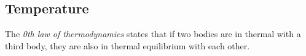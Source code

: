 \subsection{Temperature}\label{subsec:Temperature}
\begin{definition}\label{def:0_Law_Thermo}
  The \emph{0th law of thermodynamics} states that if two bodies are in thermal  with a third body, they are also in thermal equilibrium with each other.
\end{definition}


